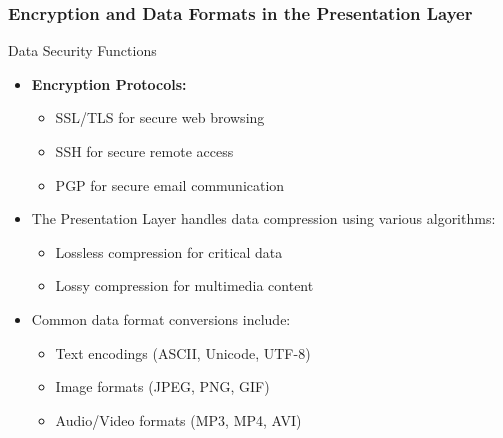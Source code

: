 \documentclass{beamer}
\begin{document}
\begin{frame}
    \frametitle{Encryption and Data Formats in the Presentation Layer}
    
    \begin{block}{Data Security Functions}
        \begin{itemize}
            \item \textbf{Encryption Protocols:}
            \begin{itemize}
                \item SSL/TLS for secure web browsing
                \item SSH for secure remote access
                \item PGP for secure email communication
            \end{itemize}
        \end{itemize}
    \end{block}
    
    \begin{itemize}
        \item The Presentation Layer handles data compression using various algorithms:
        \begin{itemize}
            \item Lossless compression for critical data
            \item Lossy compression for multimedia content
        \end{itemize}
        
        \item Common data format conversions include:
        \begin{itemize}
            \item Text encodings (ASCII, Unicode, UTF-8)
            \item Image formats (JPEG, PNG, GIF)
            \item Audio/Video formats (MP3, MP4, AVI)
        \end{itemize}
    \end{itemize}
\end{frame}
\end{document}

